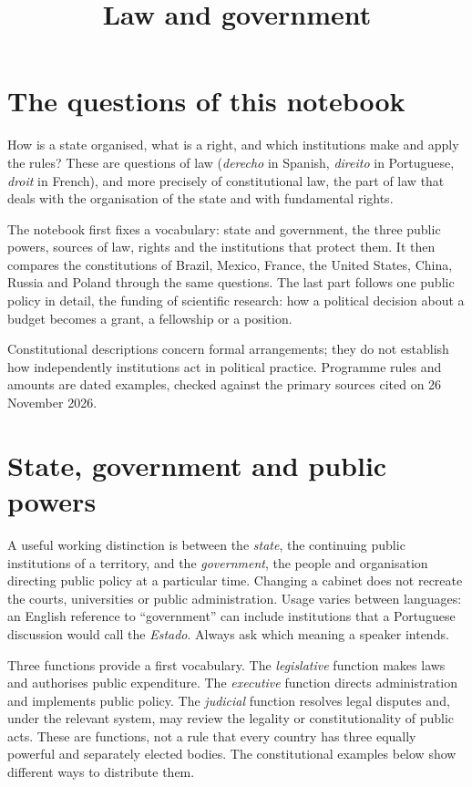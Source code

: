 



\title{Law and government}
\maketitle
\tableofcontents

\section{The questions of this notebook}
\label{section-gsf-goal}

How is a state organised, what is a right,
and which institutions make and apply the
rules? These are questions of law
(\emph{derecho} in Spanish, \emph{direito} in
Portuguese, \emph{droit} in French), and more
precisely of constitutional law, the part of
law that deals with the organisation of the
state and with fundamental rights.

The notebook first fixes a vocabulary: state
and government, the three public powers,
sources of law, rights and the institutions
that protect them. It then compares the
constitutions of Brazil, Mexico, France, the
United States, China, Russia and Poland
through the same questions. The last part
follows one public policy in detail, the
funding of scientific research: how a
political decision about a budget becomes a
grant, a fellowship or a position.

Constitutional descriptions concern formal
arrangements; they do not establish how
independently institutions act in political
practice. Programme rules and amounts are
dated examples, checked against the primary
sources cited on 26 November 2026.

\section{State, government and public powers}
\label{section-gsf-state}

A useful working distinction is between the
\emph{state}, the continuing public
institutions of a
territory, and the \emph{government}, the
people and
organisation directing public policy at a
particular time.
Changing a cabinet does not recreate the
courts,
universities or public administration.
Usage varies between languages: an English
reference to
``government'' can include institutions that
a Portuguese
discussion would call the \emph{Estado}.
Always ask which meaning a speaker intends.

Three functions provide a first vocabulary.
The \emph{legislative} function makes laws
and authorises
public expenditure. The \emph{executive}
function directs
administration and implements public policy.
The \emph{judicial} function resolves legal
disputes and,
under the relevant system, may review the
legality or
constitutionality of public acts.
These are functions, not a rule that every
country has
three equally powerful and separately elected
bodies.
The constitutional examples below show
different ways
to distribute them.

